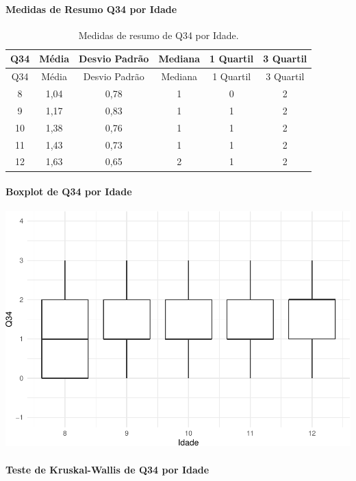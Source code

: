\documentclass[]{article}
\let\oldparagraph\paragraph
\renewcommand{\paragraph}[1]{\oldparagraph{#1}\mbox{}}
\begin{document}
\cleardoublepage

\hypertarget{medidas-de-resumo-q34-por-idade}{%
\paragraph{Medidas de Resumo Q34 por Idade}\label{medidas-de-resumo-q34-por-idade}}

\begin{longtable}[]{@{}cccccc@{}}
\caption{\label{tab:unnamed-chunk-1217}Medidas de resumo de Q34 por Idade.}\tabularnewline
\toprule
Q34 & Média & Desvio Padrão & Mediana & 1 Quartil & 3 Quartil\tabularnewline
\midrule
\endfirsthead
\toprule
Q34 & Média & Desvio Padrão & Mediana & 1 Quartil & 3 Quartil\tabularnewline
\midrule
\endhead
8 & 1,04 & 0,78 & 1 & 0 & 2\tabularnewline
9 & 1,17 & 0,83 & 1 & 1 & 2\tabularnewline
10 & 1,38 & 0,76 & 1 & 1 & 2\tabularnewline
11 & 1,43 & 0,73 & 1 & 1 & 2\tabularnewline
12 & 1,63 & 0,65 & 2 & 1 & 2\tabularnewline
\bottomrule
\end{longtable}

\hypertarget{boxplot-de-q34-por-idade}{%
\paragraph{Boxplot de Q34 por Idade}\label{boxplot-de-q34-por-idade}}

\begin{center}\includegraphics[width=0.75\linewidth]{relatorio_covid19_files/figure-latex/unnamed-chunk-1218-1} \end{center}

\hypertarget{teste-de-kruskal-wallis-de-q34-por-idade}{%
\paragraph{Teste de Kruskal-Wallis de Q34 por Idade}\label{teste-de-kruskal-wallis-de-q34-por-idade}}
\end{document}
